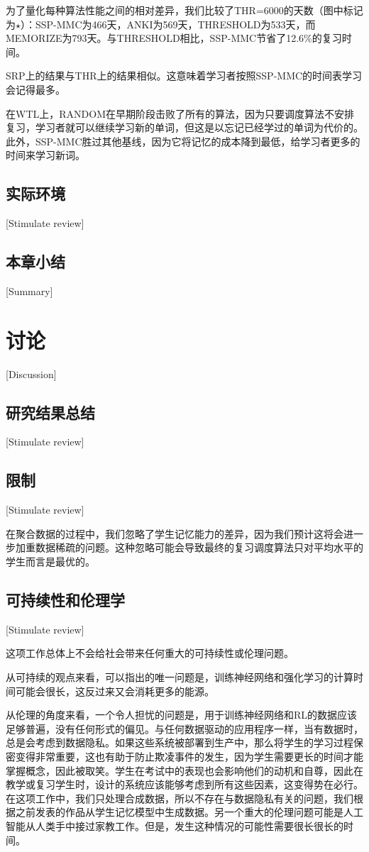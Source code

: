 为了量化每种算法性能之间的相对差异，我们比较了THR=6000的天数（图中标记为$\star$）：SSP-MMC为466天，ANKI为569天，THRESHOLD为533天，而MEMORIZE为793天。与THRESHOLD相比，SSP-MMC节省了12.6\%的复习时间。

SRP上的结果与THR上的结果相似。这意味着学习者按照SSP-MMC的时间表学习会记得最多。

在WTL上，RANDOM在早期阶段击败了所有的算法，因为只要调度算法不安排复习，学习者就可以继续学习新的单词，但这是以忘记已经学过的单词为代价的。此外，SSP-MMC胜过其他基线，因为它将记忆的成本降到最低，给学习者更多的时间来学习新词。

\section{实际环境}[Stimulate review]

\section{本章小结}[Summary]

\chapter[讨论]{讨论}[Discussion]

\section{研究结果总结}[Stimulate review]

\section{限制}[Stimulate review]

在聚合数据的过程中，我们忽略了学生记忆能力的差异，因为我们预计这将会进一步加重数据稀疏的问题。这种忽略可能会导致最终的复习调度算法只对平均水平的学生而言是最优的。

\section{可持续性和伦理学}[Stimulate review]

这项工作总体上不会给社会带来任何重大的可持续性或伦理问题。

从可持续的观点来看，可以指出的唯一问题是，训练神经网络和强化学习的计算时间可能会很长，这反过来又会消耗更多的能源。

从伦理的角度来看，一个令人担忧的问题是，用于训练神经网络和RL的数据应该足够普遍，没有任何形式的偏见。与任何数据驱动的应用程序一样，当有数据时，总是会考虑到数据隐私。如果这些系统被部署到生产中，那么将学生的学习过程保密变得非常重要，这也有助于防止欺凌事件的发生，因为学生需要更长的时间才能掌握概念，因此被取笑。学生在考试中的表现也会影响他们的动机和自尊，因此在教学或复习学生时，设计的系统应该能够考虑到所有这些因素，这变得势在必行。在这项工作中，我们只处理合成数据，所以不存在与数据隐私有关的问题，我们根据之前发表的作品从学生记忆模型中生成数据。另一个重大的伦理问题可能是人工智能从人类手中接过家教工作。但是，发生这种情况的可能性需要很长很长的时间。

